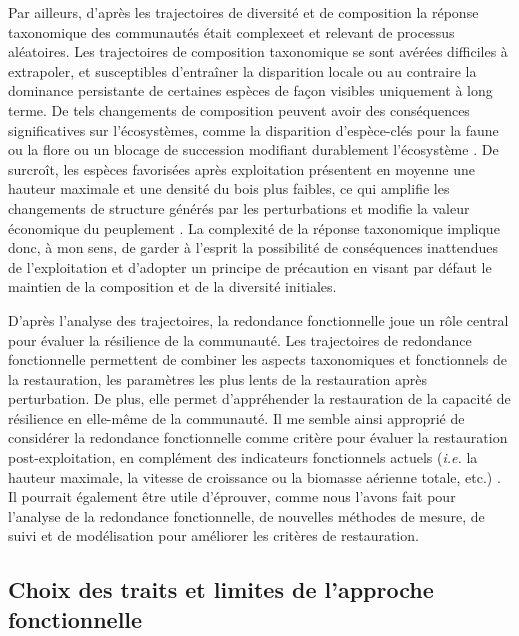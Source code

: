 \documentclass[
  11pt,
  french,
  A4paper,
  extrafontsizes,onecolumn,openright
  ]{memoir}
\begin{document}
Par ailleurs, d'après les trajectoires de diversité et de composition la
réponse taxonomique des communautés était complexeet et relevant de
processus aléatoires. Les trajectoires de composition taxonomique se
sont avérées difficiles à extrapoler, et susceptibles d'entraîner la
disparition locale ou au contraire la dominance persistante de certaines
espèces de façon visibles uniquement à long terme. De tels changements
de composition peuvent avoir des conséquences significatives sur
l'écosystèmes, comme la disparition d'espèce-clés pour la faune ou la
flore ou un blocage de succession modifiant durablement l'écosystème
\autocite{Diaz2005}. De surcroît, les espèces favorisées après
exploitation présentent en moyenne une hauteur maximale et une densité
du bois plus faibles, ce qui amplifie les changements de structure
générés par les perturbations et modifie la valeur économique du
peuplement \autocite{Reich2014}. La complexité de la réponse taxonomique
implique donc, à mon sens, de garder à l'esprit la possibilité de
conséquences inattendues de l'exploitation et d'adopter un principe de
précaution en visant par défaut le maintien de la composition et de la
diversité initiales.

D'après l'analyse des trajectoires, la redondance fonctionnelle joue un
rôle central pour évaluer la résilience de la communauté. Les
trajectoires de redondance fonctionnelle permettent de combiner les
aspects taxonomiques et fonctionnels de la restauration, les paramètres
les plus lents de la restauration après perturbation. De plus, elle
permet d'appréhender la restauration de la capacité de résilience en
elle-même de la communauté. Il me semble ainsi approprié de considérer
la redondance fonctionnelle comme critère pour évaluer la restauration
post-exploitation, en complément des indicateurs fonctionnels actuels
(\emph{i.e.} la hauteur maximale, la vitesse de croissance ou la
biomasse aérienne totale, etc.) \autocite{Sist2015}. Il pourrait
également être utile d'éprouver, comme nous l'avons fait pour l'analyse
de la redondance fonctionnelle, de nouvelles méthodes de mesure, de
suivi et de modélisation pour améliorer les critères de restauration.

\subsection{Choix des traits et limites de l'approche
fonctionnelle}\label{choix-des-traits-et-limites-de-lapproche-fonctionnelle}
\end{document}
